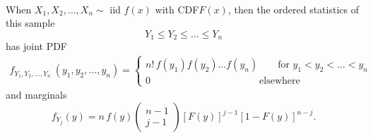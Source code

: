 \documentclass[12pt]{article}
\begin{document}

%
%
%
%
%
%
%
%
%


\newpage

\\
\noindent When $X_1, X_2, \dots, X_n \sim $ iid $f(x)$ with CDF$F(x)$, then the ordered statistics of this sample
$$Y_1 \leq Y_2 \leq \dots \leq Y_n$$
has joint PDF
\begin{align*}
    f_{Y_1, Y_2, \dots, Y_n}~(y_1, y_2, \dots, y_n)
    = \left\{
    \begin{array}{l}
         n!\,f(y_1)f(y_2)\dots f(y_n) \quad \quad\text{for } y_1 < y_2 < \dots < y_n  \\
         0 \quad \quad\quad\quad\quad\quad\quad\quad\quad\quad\quad \text{elsewhere}
    \end{array} \right.
\end{align*}
and marginals
$$f_{Y_j}(y) = n\,f(y)\begin{pmatrix} n-1 \\ j-1 \end{pmatrix} \left[F(y)\right]^{j-1} \left[1 - F(y) \right]^{n-j}.$$
\end{document}
